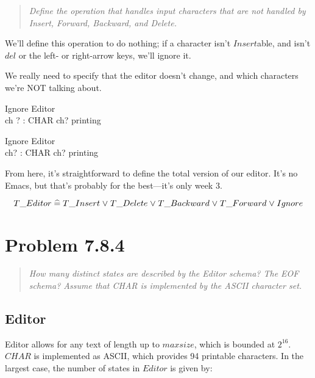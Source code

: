\documentclass[11pt]{article}
\begin{document}
\begin{quote}
  \textit{Define the operation that handles input characters that are not handled by Insert,
    Forward, Backward, and Delete.}
\end{quote}

We'll define this operation to do nothing; if a character isn't $Insert$able, and isn't $del$ or the
left- or right-arrow keys, we'll ignore it.  

{\color{orange}
  We really need to specify that the editor doesn't change, and which characters we're NOT talking
  about.

  \begin{schema}{Ignore}
    \Xi Editor \\
    ch ? : CHAR
    \where
    ch? \notin printing 
  \end{schema}
}

\begin{schema}{Ignore}
  Editor \\
  ch? : CHAR
  \where
  ch? \notin printing
\end{schema}

From here, it's straightforward to define the total version of our editor.  It's no Emacs, but
that's probably for the best---it's only week 3.

\[ T\_Editor \mathrel{\widehat=} T\_Insert \mathrel{\vee} T\_Delete \mathrel{\vee} T\_Backward \mathrel{\vee} T\_Forward \mathrel{\vee} Ignore \]


\section{Problem 7.8.4}

\begin{quote}
  \textit{How many distinct states are described by the Editor schema? The EOF schema? Assume that
    CHAR is implemented by the ASCII character set.}
\end{quote}

\subsection{Editor}
Editor allows for any text of length up to $maxsize$, which is bounded at $2^{16}$.  $CHAR$ is
implemented as ASCII, which provides 94 printable characters\footnotemark.  In the largest case, the
number of states in $Editor$ is given by:

\end{document}
